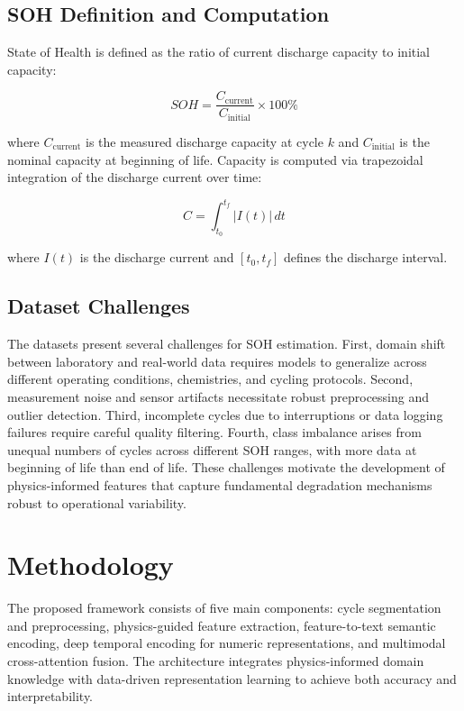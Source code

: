 \documentclass{sn-jnl}
\begin{document}
\subsection{SOH Definition and Computation}
\label{subsec:soh}

State of Health is defined as the ratio of current discharge capacity to initial capacity:

\begin{equation}
\label{eq:soh}
    SOH = \frac{C_{\text{current}}}{C_{\text{initial}}} \times 100\%
\end{equation}

where $C_{\text{current}}$ is the measured discharge capacity at cycle $k$ and $C_{\text{initial}}$ is the nominal capacity at beginning of life. Capacity is computed via trapezoidal integration of the discharge current over time:

\begin{equation}
\label{eq:capacity}
    C = \int_{t_0}^{t_f} |I(t)| \, dt
\end{equation}

where $I(t)$ is the discharge current and $[t_0, t_f]$ defines the discharge interval.

\subsection{Dataset Challenges}
\label{subsec:challenges}

The datasets present several challenges for SOH estimation. First, domain shift between laboratory and real-world data requires models to generalize across different operating conditions, chemistries, and cycling protocols. Second, measurement noise and sensor artifacts necessitate robust preprocessing and outlier detection. Third, incomplete cycles due to interruptions or data logging failures require careful quality filtering. Fourth, class imbalance arises from unequal numbers of cycles across different SOH ranges, with more data at beginning of life than end of life. These challenges motivate the development of physics-informed features that capture fundamental degradation mechanisms robust to operational variability.

\section{Methodology}
\label{sec:method}

The proposed framework consists of five main components: cycle segmentation and preprocessing, physics-guided feature extraction, feature-to-text semantic encoding, deep temporal encoding for numeric representations, and multimodal cross-attention fusion. The architecture integrates physics-informed domain knowledge with data-driven representation learning to achieve both accuracy and interpretability.
\end{document}
